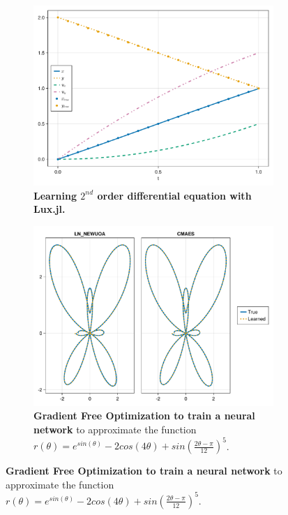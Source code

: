 \begin{figure}
  \centering
  \begin{subfigure}[c]{0.48\linewidth}
    \centering
    \includegraphics[width=\textwidth]{../figures/lux/diffeq_plot.pdf}
    \caption{\textbf{Learning $2^{nd}$ order differential equation with Lux.jl.}}
    \label{fig:lux_diffeq_plot}
  \end{subfigure}
  \hfill
  \begin{subfigure}[c]{0.48\linewidth}
    \centering
    \includegraphics[width=\textwidth]{../figures/lux/gfopt_plot.pdf}
    \caption{\textbf{Gradient Free Optimization to train a neural network} to approximate the function $r(\theta) = e^{sin(\theta)} - 2cos(4\theta) + sin\left(\frac{2\theta - \pi}{12}\right)^5$.}
    \label{fig:lux_gfopt_plot}
  \end{subfigure}
\end{figure}

